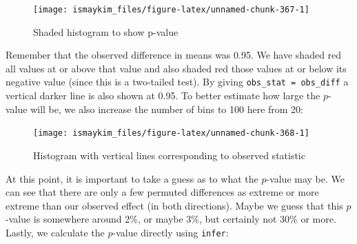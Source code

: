\documentclass[12pt, krantz2,]{krantz}
\makeatletter
\newenvironment{Shaded}{\begin{snugshade}}{\end{snugshade}}
\newcommand{\DataTypeTok}[1]{\textcolor[rgb]{0.27,0.27,0.27}{#1}}
\newcommand{\DecValTok}[1]{\textcolor[rgb]{0.06,0.06,0.06}{#1}}
\newcommand{\KeywordTok}[1]{\textcolor[rgb]{0.27,0.27,0.27}{\textbf{#1}}}
\newcommand{\NormalTok}[1]{#1}
\newcommand{\OperatorTok}[1]{\textcolor[rgb]{0.43,0.43,0.43}{\textbf{#1}}}
\newcommand{\StringTok}[1]{\textcolor[rgb]{0.5,0.5,0.5}{#1}}
\newenvironment{kframe}{%
\medskip{}
\setlength{\fboxsep}{.8em}
 \def\at@end@of@kframe{}%
 \ifinner\ifhmode%
  \def\at@end@of@kframe{\end{minipage}}%
  \begin{minipage}{\columnwidth}%
 \fi\fi%
 \def\FrameCommand##1{\hskip\@totalleftmargin \hskip-\fboxsep
 \colorbox{shadecolor}{##1}\hskip-\fboxsep
     \hskip-\linewidth \hskip-\@totalleftmargin \hskip\columnwidth}%
 \MakeFramed {\advance\hsize-\width
   \@totalleftmargin\z@ \linewidth\hsize
   \@setminipage}}%
 {\par\unskip\endMakeFramed%
 \at@end@of@kframe}
\renewenvironment{Shaded}{\begin{kframe}}{\end{kframe}}
\makeatother
\begin{document}
\begin{Shaded}
\end{Shaded}

\begin{figure}

{\centering \texttt{[image: ismaykim\_files/figure-latex/unnamed-chunk-367-1]} 

}

\caption{Shaded histogram to show p-value}\label{fig:unnamed-chunk-367}
\end{figure}

Remember that the observed difference in means was 0.95. We have shaded red all values at or above that value and also shaded red those values at or below its negative value (since this is a two-tailed test). By giving \texttt{obs\_stat\ =\ obs\_diff} a vertical darker line is also shown at 0.95. To better estimate how large the \(p\)-value will be, we also increase the number of bins to 100 here from 20:

\begin{Shaded}
\end{Shaded}

\begin{figure}

{\centering \texttt{[image: ismaykim\_files/figure-latex/unnamed-chunk-368-1]} 

}

\caption{Histogram with vertical lines corresponding to observed statistic}\label{fig:unnamed-chunk-368}
\end{figure}

At this point, it is important to take a guess as to what the \(p\)-value may be. We can see that there are only a few permuted differences as extreme or more extreme than our observed effect (in both directions). Maybe we guess that this \(p\)-value is somewhere around 2\%, or maybe 3\%, but certainly not 30\% or more. Lastly, we calculate the \(p\)-value directly using \texttt{infer}:
\end{document}

